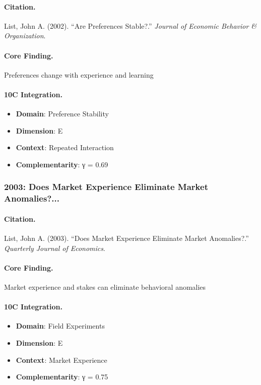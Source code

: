 \paragraph{Citation.}
List, John A. (2002). ``Are Preferences Stable?.''
\textit{Journal of Economic Behavior & Organization}.

\paragraph{Core Finding.}
Preferences change with experience and learning

\paragraph{10C Integration.}
\begin{itemize}[nosep]
  \item \textbf{Domain}: Preference Stability
  \item \textbf{Dimension}: E
  \item \textbf{Context}: Repeated Interaction
  \item \textbf{Complementarity}: γ = 0.69
\end{itemize}


\subsubsection{2003: Does Market Experience Eliminate Market Anomalies?...}

\paragraph{Citation.}
List, John A. (2003). ``Does Market Experience Eliminate Market Anomalies?.''
\textit{Quarterly Journal of Economics}.

\paragraph{Core Finding.}
Market experience and stakes can eliminate behavioral anomalies

\paragraph{10C Integration.}
\begin{itemize}[nosep]
  \item \textbf{Domain}: Field Experiments
  \item \textbf{Dimension}: E
  \item \textbf{Context}: Market Experience
  \item \textbf{Complementarity}: γ = 0.75
\end{itemize}


